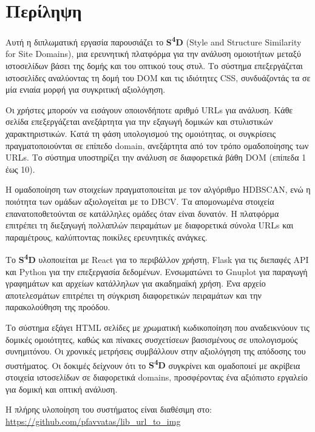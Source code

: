\newpage
{}
\chapter*{Περίληψη}

Αυτή η διπλωματική εργασία παρουσιάζει το \textlatin{\textbf{S\textsuperscript{4}D} (Style and Structure Similarity for Site Domains)}, μια ερευνητική πλατφόρμα για την ανάλυση ομοιοτήτων μεταξύ ιστοσελίδων βάσει της δομής και του οπτικού τους στυλ. Το σύστημα επεξεργάζεται ιστοσελίδες αναλύοντας τη δομή του \textlatin{DOM} και τις ιδιότητες \textlatin{CSS}, συνδυάζοντάς τα σε μία ενιαία μορφή για συγκριτική αξιολόγηση.

Οι χρήστες μπορούν να εισάγουν οποιονδήποτε αριθμό \textlatin{URLs} για ανάλυση. Κάθε σελίδα επεξεργάζεται ανεξάρτητα για την εξαγωγή δομικών και στυλιστικών χαρακτηριστικών. Κατά τη φάση υπολογισμού της ομοιότητας, οι συγκρίσεις πραγματοποιούνται σε επίπεδο \textlatin{domain}, ανεξάρτητα από τον τρόπο ομαδοποίησης των \textlatin{URLs}. Το σύστημα υποστηρίζει την ανάλυση σε διαφορετικά βάθη \textlatin{DOM} (επίπεδα 1 έως 10).

Η ομαδοποίηση των στοιχείων πραγματοποιείται με τον αλγόριθμο \textlatin{HDBSCAN}, ενώ η ποιότητα των ομάδων αξιολογείται με το \textlatin{DBCV}. Τα απομονωμένα στοιχεία επανατοποθετούνται σε κατάλληλες ομάδες όταν είναι δυνατόν. Η πλατφόρμα επιτρέπει τη διεξαγωγή πολλαπλών πειραμάτων με διαφορετικά σύνολα \textlatin{URLs} και παραμέτρους, καλύπτοντας ποικίλες ερευνητικές ανάγκες.

Το \textlatin{\textbf{S\textsuperscript{4}D}} υλοποιείται με \textlatin{React} για το περιβάλλον χρήστη, \textlatin{Flask} για τις διεπαφές \textlatin{API} και \textlatin{Python} για την επεξεργασία δεδομένων. Ενσωματώνει το \textlatin{Gnuplot} για παραγωγή γραφημάτων και αρχείων κατάλληλων για ακαδημαϊκή χρήση. Ένα αρχείο αποτελεσμάτων επιτρέπει τη σύγκριση διαφορετικών πειραμάτων και την παρακολούθηση της προόδου.

Το σύστημα εξάγει \textlatin{HTML} σελίδες με χρωματική κωδικοποίηση που αναδεικνύουν τις δομικές ομοιότητες, καθώς και πίνακες συσχετίσεων βασισμένους σε υπολογισμούς συνημιτόνου. Οι χρονικές μετρήσεις συμβάλλουν στην αξιολόγηση της απόδοσης του συστήματος. Οι δοκιμές δείχνουν ότι το \textlatin{\textbf{S\textsuperscript{4}D}} συγκρίνει και ομαδοποιεί με ακρίβεια στοιχεία ιστοσελίδων σε διαφορετικά \textlatin{domains}, προσφέροντας ένα αξιόπιστο εργαλείο για δομική και οπτική ανάλυση.

Η πλήρης υλοποίηση του συστήματος είναι διαθέσιμη στο: \textlatin{\url{https://github.com/pfavvatas/lib_url_to_img}}
